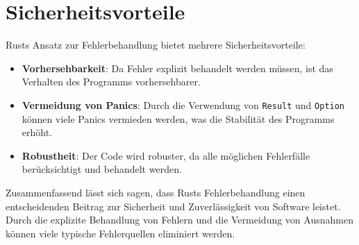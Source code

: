 \section{Sicherheitsvorteile}
Rusts Ansatz zur Fehlerbehandlung bietet mehrere Sicherheitsvorteile:

\begin{itemize}
    \item \textbf{Vorhersehbarkeit}: Da Fehler explizit behandelt werden müssen, ist das Verhalten des Programms vorhersehbarer.
    \item \textbf{Vermeidung von Panics}: Durch die Verwendung von \texttt{Result} und \texttt{Option} können viele Panics vermieden werden, was die Stabilität des Programms erhöht.
    \item \textbf{Robustheit}: Der Code wird robuster, da alle möglichen Fehlerfälle berücksichtigt und behandelt werden.
\end{itemize}
\noindent
Zusammenfassend lässt sich sagen, dass Rusts Fehlerbehandlung einen entscheidenden Beitrag zur Sicherheit und Zuverlässigkeit von Software leistet. Durch die explizite Behandlung von Fehlern und die Vermeidung von Ausnahmen können viele typische Fehlerquellen eliminiert werden.

